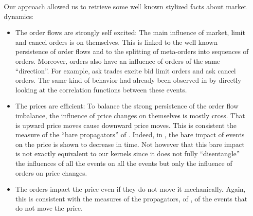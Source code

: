 \documentclass[a4paper,11pt]{article}
\begin{document}
\noindent Our approach allowed us to retrieve some well known stylized facts about market dynamics:
\begin{itemize}

\item{The order flows are strongly self excited: The main influence of market, limit and cancel orders is on themselves. This is linked to the well known persistence of order flows and to the splitting of meta-orders into sequences of orders. Moreover, orders also have an influence of orders of the same ``direction''. For example, ask trades excite bid limit orders and ask cancel orders. The same kind of behavior had already been observed in \cite{eisler2012price} by directly looking at the correlation functions between these events.}

\item{The prices are efficient: To balance the strong persistence of the order flow imbalance, the influence of price changes on themselves is mostly cross. That is upward price moves cause downward price moves. This is consistent the measure of the ``bare propagators'' of \cite{eisler2012price}. Indeed, in \cite{eisler2012price}, the bare impact of events on the price is shown to decrease in time. Not however that this bare impact is not exactly equivalent to our kernels since it does not fully ``disentangle'' the influences of all the events on all the events but only the influence of orders on price changes.}

\item{The orders impact the price even if they do not move it mechanically. Again, this is consistent with the measures of the propagators, of \cite{eisler2012price}, of the events that do not move the price.}

\end{itemize}
\end{document}
